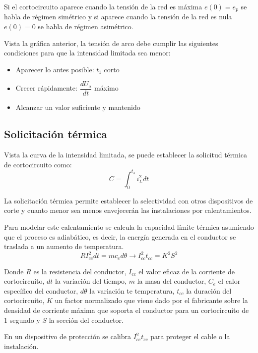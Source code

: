 Si el cortocircuito aparece cuando la tensión de la red  es máxima $e(0)=e_p$ se habla de régimen simétrico y si aparece cuando la tensión de la red  es nula $e(0)=0$ se habla de régimen asimétrico.
\newline

Vista la gráfica anterior, la tensión de arco debe cumplir las siguientes condiciones para que la intensidad limitada sea menor:
\begin{itemize}
	\item Aparecer lo antes posible: $t_1$ corto
	\item Crecer rápidamente: $\dfrac{dU_a}{dt}$ máximo
	\item Alcanzar un valor suficiente y mantenido
\end{itemize}

\subsection{Solicitación térmica}
Vista la curva de la intensidad limitada, se puede establecer la solicitud térmica de cortocircuito como:
\begin{equation}
	C=\int_{0}^{t_3} i_L^2dt
\end{equation}

La solicitación térmica permite establecer la selectividad con otros dispositivos de corte y cuanto menor sea menos envejecerán las instalaciones por calentamientos.
\newline

Para modelar este calentamiento se calcula la capacidad límite térmica asumiendo que el proceso es adiabático, es decir, la energía generada en el conductor se traslada a un aumento de temperatura.
\begin{equation}
	R I_{cc}^2dt=mc_ed\theta \rightarrow I_{cc}^2t_{cc}=K^2S^2
\end{equation}

Donde $R$ es la resistencia del conductor, $I_{cc}$ el valor eficaz de la corriente de cortocircuito, $dt$ la variación del tiempo, $m$ la masa del conductor, $C_e$ el calor específico del conductor, $d\theta$ la variación te temperatura, $t_{cc}$ la duración del cortocircuito, $K$ un factor normalizado que viene dado por el fabricante sobre la densidad de corriente máxima que soporta el conductor para un cortocircuito de 1 segundo y $S$ la sección del conductor.
\newline

En un dispositivo de protección se calibra $I_{cc}^2t_{cc}$ para proteger el cable o la instalación.

